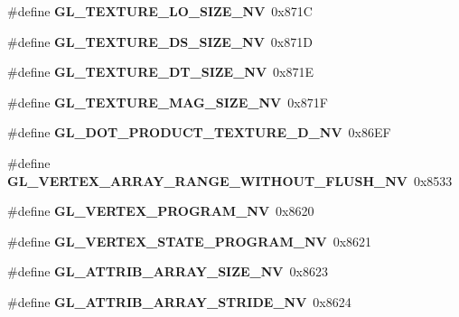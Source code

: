 \begin{DoxyCompactItemize}
\item 
\#define {\bfseries G\+L\+\_\+\+T\+E\+X\+T\+U\+R\+E\+\_\+\+L\+O\+\_\+\+S\+I\+Z\+E\+\_\+\+N\+V}~0x871\+C\label{_s_d_l__opengl_8h_acfd2712d4f614f6e104b3e827fbbdafc}

\item 
\#define {\bfseries G\+L\+\_\+\+T\+E\+X\+T\+U\+R\+E\+\_\+\+D\+S\+\_\+\+S\+I\+Z\+E\+\_\+\+N\+V}~0x871\+D\label{_s_d_l__opengl_8h_a7e0cccbd301acea7565c83fb76210d87}

\item 
\#define {\bfseries G\+L\+\_\+\+T\+E\+X\+T\+U\+R\+E\+\_\+\+D\+T\+\_\+\+S\+I\+Z\+E\+\_\+\+N\+V}~0x871\+E\label{_s_d_l__opengl_8h_a92b8f60e59c2e7aff796b1710b43b92f}

\item 
\#define {\bfseries G\+L\+\_\+\+T\+E\+X\+T\+U\+R\+E\+\_\+\+M\+A\+G\+\_\+\+S\+I\+Z\+E\+\_\+\+N\+V}~0x871\+F\label{_s_d_l__opengl_8h_ac29092d4ed56e0cabad91605a07aa069}

\item 
\#define {\bfseries G\+L\+\_\+\+D\+O\+T\+\_\+\+P\+R\+O\+D\+U\+C\+T\+\_\+\+T\+E\+X\+T\+U\+R\+E\+\_\+D\+\_\+\+N\+V}~0x86\+E\+F\label{_s_d_l__opengl_8h_a1d0feb369a16b6771ec7e384e771cea5}

\item 
\#define {\bfseries G\+L\+\_\+\+V\+E\+R\+T\+E\+X\+\_\+\+A\+R\+R\+A\+Y\+\_\+\+R\+A\+N\+G\+E\+\_\+\+W\+I\+T\+H\+O\+U\+T\+\_\+\+F\+L\+U\+S\+H\+\_\+\+N\+V}~0x8533\label{_s_d_l__opengl_8h_a228f1e25b6f758b6152ad4fd289a8603}

\item 
\#define {\bfseries G\+L\+\_\+\+V\+E\+R\+T\+E\+X\+\_\+\+P\+R\+O\+G\+R\+A\+M\+\_\+\+N\+V}~0x8620\label{_s_d_l__opengl_8h_ab5a7778b2748992e5770a4a627a645fa}

\item 
\#define {\bfseries G\+L\+\_\+\+V\+E\+R\+T\+E\+X\+\_\+\+S\+T\+A\+T\+E\+\_\+\+P\+R\+O\+G\+R\+A\+M\+\_\+\+N\+V}~0x8621\label{_s_d_l__opengl_8h_a9f4b909ccf5a60b7499d1bc274f66d1a}

\item 
\#define {\bfseries G\+L\+\_\+\+A\+T\+T\+R\+I\+B\+\_\+\+A\+R\+R\+A\+Y\+\_\+\+S\+I\+Z\+E\+\_\+\+N\+V}~0x8623\label{_s_d_l__opengl_8h_acab0475dba9943e0f97b5d992194e2bd}

\item 
\#define {\bfseries G\+L\+\_\+\+A\+T\+T\+R\+I\+B\+\_\+\+A\+R\+R\+A\+Y\+\_\+\+S\+T\+R\+I\+D\+E\+\_\+\+N\+V}~0x8624\label{_s_d_l__opengl_8h_a06ed303f8a6114fc221770ef9e7b4b20}


\end{DoxyCompactItemize}
